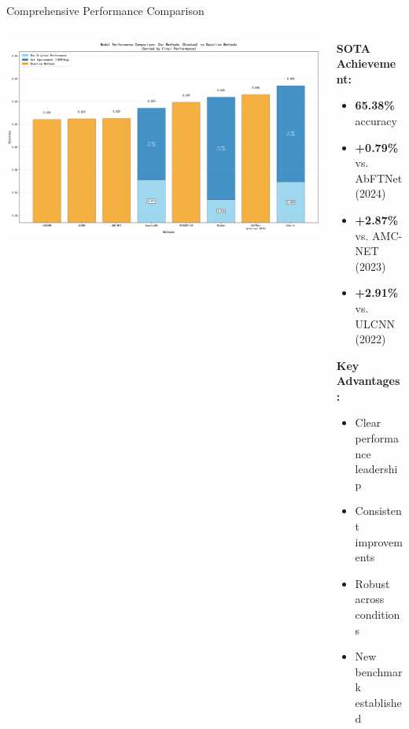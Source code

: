 \documentclass[aspectratio=169]{beamer}
\begin{document}
\begin{frame}{Comprehensive Performance Comparison}
\begin{columns}
\begin{column}{0.6\textwidth}
\includegraphics[width=\textwidth]{figure/sorted_stacked_comparison.png}
\end{column}
\begin{column}{0.4\textwidth}
\textbf{SOTA Achievement:}
\begin{itemize}
\item \textcolor{zjutred}{\textbf{65.38\%}} accuracy
\item \textcolor{zjutgreen}{\textbf{+0.79\%}} vs. AbFTNet (2024)
\item \textcolor{zjutgreen}{\textbf{+2.87\%}} vs. AMC-NET (2023)
\item \textcolor{zjutgreen}{\textbf{+2.91\%}} vs. ULCNN (2022)
\end{itemize}

\vspace{0.1cm}
\textbf{Key Advantages:}
\begin{itemize}
\item Clear performance leadership
\item Consistent improvements
\item Robust across conditions
\item New benchmark established
\end{itemize}

\vspace{0.1cm}
\begin{center}
\end{center}
\end{column}
\end{columns}
\end{frame}
\end{document}
